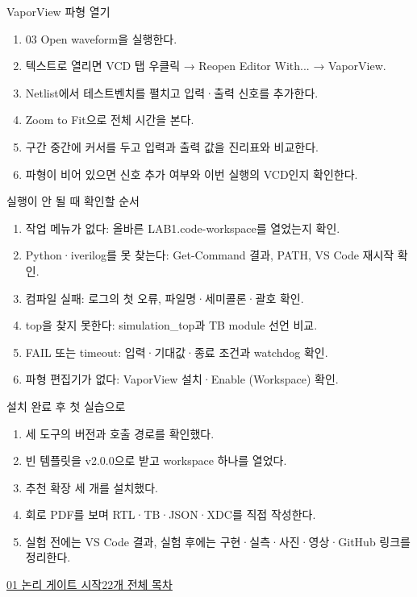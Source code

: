 \begin{frame}{VaporView 파형 열기}\relax
\small
\begin{enumerate}\setlength{\itemsep}{0.22cm}
\item 03 Open waveform을 실행한다.
\item 텍스트로 열리면 VCD 탭 우클릭 → Reopen Editor With... → VaporView.
\item Netlist에서 테스트벤치를 펼치고 입력·출력 신호를 추가한다.
\item Zoom to Fit으로 전체 시간을 본다.
\item 구간 중간에 커서를 두고 입력과 출력 값을 진리표와 비교한다.
\item 파형이 비어 있으면 신호 추가 여부와 이번 실행의 VCD인지 확인한다.
\end{enumerate}

\end{frame}

\begin{frame}{실행이 안 될 때 확인할 순서}\relax
\small
\begin{enumerate}\setlength{\itemsep}{0.22cm}
\item 작업 메뉴가 없다: 올바른 LAB1.code-workspace를 열었는지 확인.
\item Python·iverilog를 못 찾는다: Get-Command 결과, PATH, VS Code 재시작 확인.
\item 컴파일 실패: 로그의 첫 오류, 파일명·세미콜론·괄호 확인.
\item top을 찾지 못한다: simulation\_top과 TB module 선언 비교.
\item FAIL 또는 timeout: 입력·기대값·종료 조건과 watchdog 확인.
\item 파형 편집기가 없다: VaporView 설치·Enable (Workspace) 확인.
\end{enumerate}

\end{frame}

\begin{frame}{설치 완료 후 첫 실습으로}\relax
\small
\begin{enumerate}\setlength{\itemsep}{0.22cm}
\item 세 도구의 버전과 호출 경로를 확인했다.
\item 빈 템플릿을 v2.0.0으로 받고 workspace 하나를 열었다.
\item 추천 확장 세 개를 설치했다.
\item 회로 PDF를 보며 RTL·TB·JSON·XDC를 직접 작성한다.
\item 실험 전에는 VS Code 결과, 실험 후에는 구현·실측·사진·영상·GitHub 링크를 정리한다.
\end{enumerate}
\href{04.LAB1_01_LOGIC_GATES_VIVADO.pdf}{01 논리 게이트 시작}\quad\href{04.LAB1_00_CONTENTS.pdf}{22개 전체 목차}
\end{frame}
\endgroup


